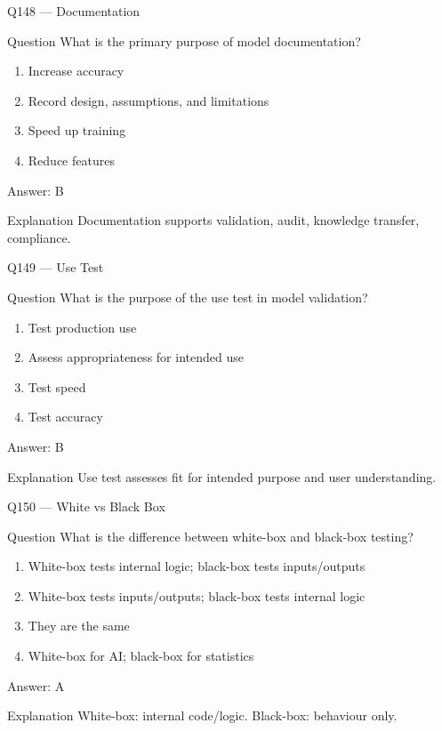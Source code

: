 \documentclass[aspectratio=169,8pt]{beamer}
\begin{document}
	\begin{frame}{Q148 --- Documentation}
		\begin{block}{Question}
			What is the primary purpose of model documentation?
		\end{block}
		\begin{enumerate}
			\item Increase accuracy
			\item Record design, assumptions, and limitations
			\item Speed up training
			\item Reduce features
		\end{enumerate}
		\begin{exampleblock}{Answer: B}\end{exampleblock}
		\begin{block}{Explanation}
			Documentation supports validation, audit, knowledge transfer, compliance.
		\end{block}
	\end{frame}
	
	\begin{frame}{Q149 --- Use Test}
		\begin{block}{Question}
			What is the purpose of the use test in model validation?
		\end{block}
		\begin{enumerate}
			\item Test production use
			\item Assess appropriateness for intended use
			\item Test speed
			\item Test accuracy
		\end{enumerate}
		\begin{exampleblock}{Answer: B}\end{exampleblock}
		\begin{block}{Explanation}
			Use test assesses fit for intended purpose and user understanding.
		\end{block}
	\end{frame}
	
	\begin{frame}{Q150 --- White vs Black Box}
		\begin{block}{Question}
			What is the difference between white-box and black-box testing?
		\end{block}
		\begin{enumerate}
			\item White-box tests internal logic; black-box tests inputs/outputs
			\item White-box tests inputs/outputs; black-box tests internal logic
			\item They are the same
			\item White-box for AI; black-box for statistics
		\end{enumerate}
		\begin{exampleblock}{Answer: A}\end{exampleblock}
		\begin{block}{Explanation}
			White-box: internal code/logic. Black-box: behaviour only.
		\end{block}
	\end{frame}
	
\end{document}
